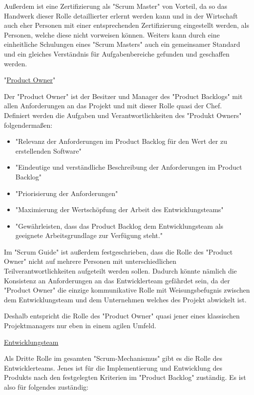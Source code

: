 Außerdem ist eine Zertifizierung als "Scrum Master" von Vorteil, da so das Handwerk dieser Rolle detaillierter erlernt werden kann und in der Wirtschaft auch eher Personen mit einer entsprechenden Zertifizierung eingestellt werden, als Personen, welche diese nicht vorweisen können. Weiters kann durch eine einheitliche Schulungen eines "Scrum Masters" auch ein gemeinsamer Standard und ein gleiches Verständnis für Aufgabenbereiche gefunden und geschaffen werden. \cite{ScrumMaster}

"\underline{Product Owner}"

Der "Product Owner" ist der Besitzer und Manager des "Product Backlogs" mit allen Anforderungen an das Projekt und mit dieser Rolle quasi der Chef. Definiert werden die Aufgaben und Verantwortlichkeiten des "Produkt Owners" folgendermaßen: \cite{ProductOwner}

\begin{itemize}
    \item "Relevanz der Anforderungen im Product Backlog für den Wert der zu erstellenden Software" \cite{ProductOwner}
    \item "Eindeutige und verständliche Beschreibung der Anforderungen im Product Backlog" \cite{ProductOwner}
    \item "Priorisierung der Anforderungen" \cite{ProductOwner}
    \item "Maximierung der Wertschöpfung der Arbeit des Entwicklungsteams" \cite{ProductOwner}
    \item "Gewährleisten, dass das Product Backlog dem Entwicklungsteam als geeignete Arbeitsgrundlage zur Verfügung steht." \cite{ProductOwner}
\end{itemize}

Im "Scrum Guide" ist außerdem festgeschrieben, dass die Rolle des "Product Owner" nicht auf mehrere Personen mit unterschiedlichen Teilverantwortlichkeiten aufgeteilt werden sollen. Dadurch könnte nämlich die Konsistenz an Anforderungen an das Entwicklerteam gefährdet sein, da der "Product Owner" die einzige kommunikative Rolle mit Weisungsbefugnis zwischen dem Entwicklungsteam und dem Unternehmen welches des Projekt abwickelt ist. \cite{ProductOwner}

Deshalb entspricht die Rolle des "Product Owner" quasi jener eines klassischen Projektmanagers nur eben in einem agilen Umfeld. \cite{ProductOwner}

\underline{Entwicklungsteam}

Als Dritte Rolle im gesamten "Scrum-Mechanismus" gibt es die Rolle des Entwicklerteams. Jenes ist für die Implementierung und Entwicklung des Produkts nach den festgelegten Kriterien im "Product Backlog" zuständig. Es ist also für folgendes zuständig: \cite{Entwicklungsteam}

